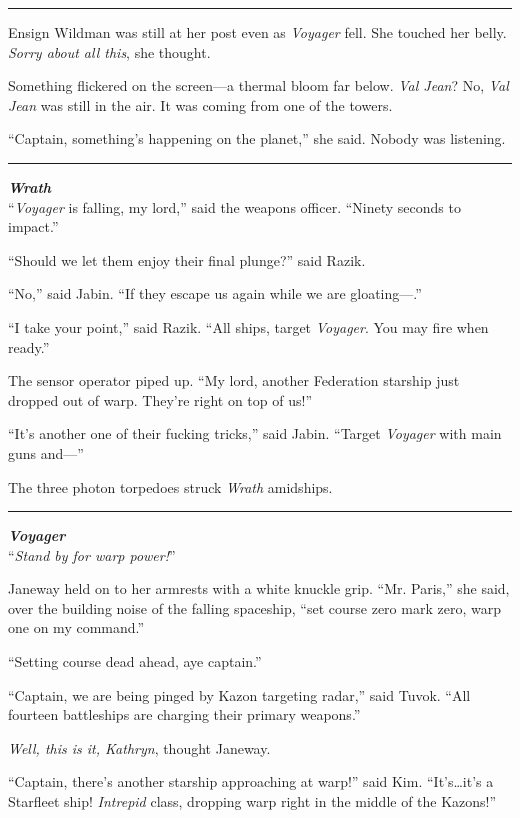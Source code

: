 \documentclass[twoside,letterpaper,12pt]{memoir}
\begin{document}
\fancybreak{\rule{3cm}{0.4 pt}}
Ensign Wildman was still at her post even as \textit{Voyager} fell. She touched her belly. \textit{Sorry about all this}, she thought.

Something flickered on the screen---a thermal bloom far below. \textit{Val Jean}? No, \textit{Val Jean} was still in the air. It was coming from one of the towers.

``Captain, something's happening on the planet,'' she said. Nobody was listening.

\fancybreak{\rule{3cm}{0.4 pt}}
\noindent\textit{\textbf{Wrath}}\\

``\textit{Voyager} is falling, my lord,'' said the weapons officer. ``Ninety seconds to impact.''

``Should we let them enjoy their final plunge?'' said Razik.

``No,'' said Jabin. ``If they escape us again while we are gloating---.''

``I take your point,'' said Razik. ``All ships, target \textit{Voyager}. You may fire when ready.''

The sensor operator piped up. ``My lord, another Federation starship just dropped out of warp. They're right on top of us!''

``It's another one of their fucking tricks,'' said Jabin. ``Target \textit{Voyager} with main guns and---''

The three photon torpedoes struck \textit{Wrath} amidships.

\fancybreak{\rule{3cm}{0.4 pt}}
\noindent\textit{\textbf{Voyager}}\\

``\textit{Stand by for warp power!}''

Janeway held on to her armrests with a white knuckle grip. ``Mr. Paris,'' she said, over the building noise of the falling spaceship, ``set course zero mark zero, warp one on my command.''

``Setting course dead ahead, aye captain.''

``Captain, we are being pinged by Kazon targeting radar,'' said Tuvok. ``All fourteen battleships are charging their primary weapons.''

\textit{Well, this is it, Kathryn}, thought Janeway.

``Captain, there's another starship approaching at warp!'' said Kim. ``It's\ldots it's a Starfleet ship! \textit{Intrepid} class, dropping warp right in the middle of the Kazons!''
\end{document}
